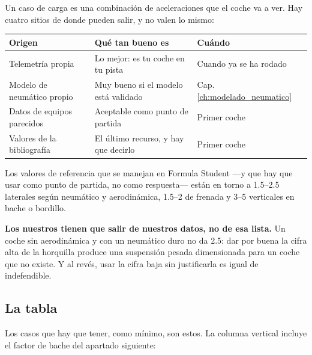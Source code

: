 Un caso de carga es una combinación de aceleraciones que el coche va a ver.
Hay cuatro sitios de donde pueden salir, y no valen lo mismo:

\begin{center}
\begin{tabularx}{\textwidth}{@{}lXl@{}}
\toprule
\textbf{Origen} & \textbf{Qué tan bueno es} & \textbf{Cuándo} \\
\midrule
Telemetría propia & Lo mejor: es tu coche en tu pista & Cuando ya se ha rodado \\
Modelo de neumático propio & Muy bueno si el modelo está validado & Cap. \ref{ch:modelado_neumatico} \\
Datos de equipos parecidos & Aceptable como punto de partida & Primer coche \\
Valores de la bibliografía & El último recurso, y hay que decirlo & Primer coche \\
\bottomrule
\end{tabularx}
\end{center}

Los valores de referencia que se manejan en Formula Student ---y que hay que
usar como punto de partida, no como respuesta--- están en torno a
\SIrange{1.5}{2.5}{\gacc} laterales según neumático y aerodinámica,
\SIrange{1.5}{2}{\gacc} de frenada y \SIrange{3}{5}{\gacc} verticales en bache
o bordillo.

\begin{ojo}
\textbf{Los nuestros tienen que salir de nuestros datos, no de esa lista.} Un
coche sin aerodinámica y con un neumático duro no da \SI{2.5}{\gacc}: dar por
buena la cifra alta de la horquilla produce una suspensión pesada dimensionada
para un coche que no existe. Y al revés, usar la cifra baja sin justificarla es
igual de indefendible.
\end{ojo}

\subsection{La tabla}

Los casos que hay que tener, como mínimo, son estos. La columna vertical incluye
el factor de bache del apartado siguiente:

